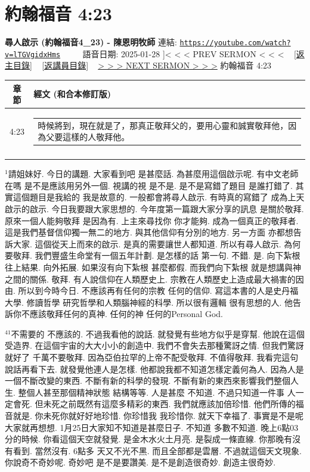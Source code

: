 \documentclass{book}
\begin{document}
\section{約翰福音 4:23}
\label{sec:lTGVgidxHms}
\textbf{尋人啟示 (約翰福音4\_23) - 陳恩明牧師}
\newline
\newline
連結: \href{https://youtube.com/watch?v=lTGVgidxHms}{\texttt{https://youtube.com/watch?v=lTGVgidxHms}} ~~~~ 語音日期: 2025-01-28
\newline
\newline
\hyperref[sec:fRyhfftiI8]]{< < < PREV SERMON < < <}
~
\hyperlink{toc}{[返主目錄]}
~
\hyperref[ch:preacher14]{[返講員目錄]}
~
\hyperref[sec:2sEF8L92TnY]{> > > NEXT SERMON > > >}
\newline
\newline
約翰福音 4:23
\newline
\begin{longtable}{cl}
\hline
\hline
章節 & 經文 (和合本修訂版)\\
\hline
4:23 & \begin{tabularx}{0.7\textwidth}{X} 時候將到，現在就是了，那真正敬拜父的，要用心靈和誠實敬拜他，因為父要這樣的人敬拜他。 \end{tabularx} \\ \\
[1ex]
\hline
\hline
\end{longtable}
$^{1}$請姐妹好.
今日的講題.
大家看到吧 是甚麼話.
為甚麼用這個啟示呢.
有中文老師在嗎 是不是應該用另外一個.
視講的視 是不是.
是不是寫錯了題目 是誰打錯了.
其實這個題目是我給的 我是故意的.
一般都會將尋人啟示.
有時真的寫錯了 成為上天啟示的啟示.
今日我要跟大家思想的.
今年度第一篇跟大家分享的訊息 是關於敬拜.
原來一個人能夠敬拜 是因為有.
上主來尋找你 你才能夠.
成為一個真正的敬拜者.
這是我們基督信仰獨一無二的地方.
與其他信仰有分別的地方.
另一方面 亦都想告訴大家.
這個從天上而來的啟示.
是真的需要讓世人都知道.
所以有尋人啟示.
為何要敬拜.
我們豐盛生命堂有一個五年計劃.
是怎樣的話 第一句.
不錯.
是.
向下紮根 往上結果.
向外拓展.
如果沒有向下紮根 甚麼都假.
而我們向下紮根 就是想講與神之間的關係.
敬拜.
有人說信仰在人類歷史上.
宗教在人類歷史上造成最大禍害的因由.
所以到今時今日.
不應該再有任何的宗教 任何的信仰.
寫這本書的人是史丹福大學.
修讀哲學 研究哲學和人類腦神經的科學.
所以很有邏輯 很有思想的人.
他告訴你不應該敬拜任何的真神.
任何的神 任何的Personal God.

$^{41}$不需要的 不應該的.
不過我看他的說話.
就發覺有些地方似乎是穿幫.
他說在這個受造界.
在這個宇宙的大大小小的創造中.
我們不會失去那種驚訝之情.
但我們驚訝就好了 千萬不要敬拜.
因為亞伯拉罕的上帝不配受敬拜.
不值得敬拜.
我看完這句說話再看下去.
就發覺他連人是怎樣.
他都說我都不知道怎樣定義何為人.
因為人是一個不斷改變的東西.
不斷有新的科學的發現.
不斷有新的東西來影響我們整個人生.
整個人甚至那個精神狀態 結構等等.
人是甚麼 不知道.
不過只知道一件事 人一定會死.
但未死之前既然有這麼多精彩的東西.
我們就應該加倍珍惜.
他們所傳的福音就是.
你未死你就好好地珍惜.
你珍惜我 我珍惜你.
就天下幸福了.
事實是不是呢 大家就再想想.
1月25日大家知不知道是甚麼日子.
不知道 多數不知道.
晚上6點03分的時候.
你看這個天空就發覺.
是金木水火土月亮.
是裂成一條直線.
你那晚有沒有看到.
當然沒有.
6點多 天又不光不黑.
而且全部都是雲層.
不過就這個天文現象.
你說奇不奇妙呢.
奇妙吧 是不是要讚美.
是不是創造很奇妙.
創造主很奇妙.
\end{document}
